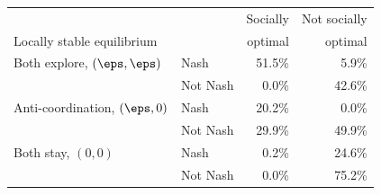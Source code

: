 \begin{tabular}{@{}llrr@{}}
\toprule
 &  & Socially & Not socially \\
Locally stable equilibrium &  & optimal & optimal \\
\midrule
Both explore, $(\eps,\eps)$ & Nash & 51.5\% & 5.9\% \\
 & Not Nash & 0.0\% & 42.6\% \\
\addlinespace
Anti-coordination, $(\eps,0)$ & Nash & 20.2\% & 0.0\% \\
 & Not Nash & 29.9\% & 49.9\% \\
\addlinespace
Both stay, $(0,0)$ & Nash & 0.2\% & 24.6\% \\
 & Not Nash & 0.0\% & 75.2\% \\
\bottomrule
\end{tabular}
